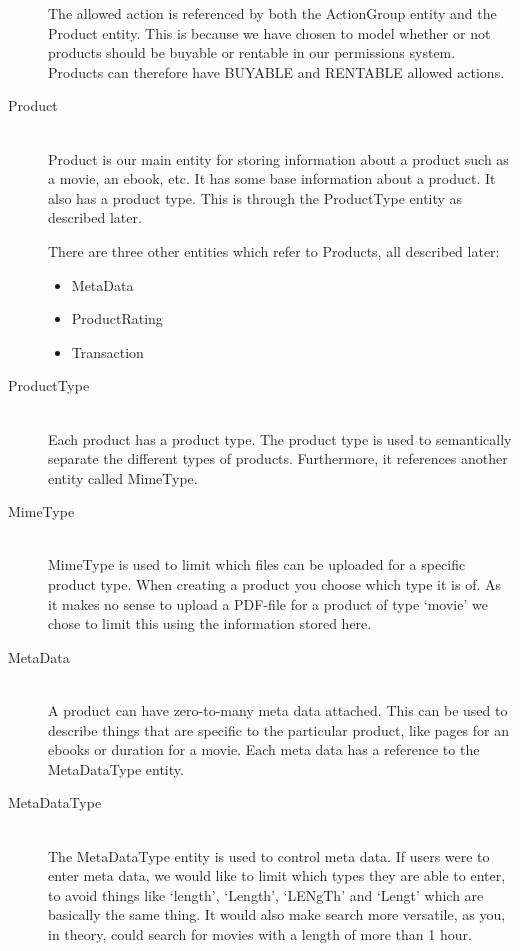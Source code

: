 \begin{description}
The allowed action is referenced by both the ActionGroup entity and the Product entity. This is because we have chosen to model whether or not products should be buyable or rentable in our permissions system. Products can therefore have BUYABLE and RENTABLE allowed actions.

\item[Product] \hfill \\ 
Product is our main entity for storing information about a product such as a movie, an ebook, etc. It has some base information about a product. It also has a product type. This is through the ProductType entity as described later.

There are three other entities which refer to Products, all described later:
\begin{itemize}
	\item MetaData
	\item ProductRating
	\item Transaction
\end{itemize}

\item[ProductType] \hfill \\
Each product has a product type. The product type is used to semantically separate the different types of products. Furthermore, it references another entity called MimeType.

\item[MimeType] \hfill \\
MimeType is used to limit which files can be uploaded for a specific product type. When creating a product you choose which type it is of. As it makes no sense to upload a PDF-file for a product of type `movie' we chose to limit this using the information stored here.

\item[MetaData] \hfill \\
A product can have zero-to-many meta data attached. This can be used to describe things that are specific to the particular product, like pages for an ebooks or duration for a movie. Each meta data has a reference to the MetaDataType entity.

\item[MetaDataType] \hfill \\
The MetaDataType entity is used to control meta data. If users were to enter meta data, we would like to limit which types they are able to enter, to avoid things like `length', `Length', `LENgTh' and `Lengt' which are basically the same thing. It would also make search more versatile, as you, in theory, could search for movies with a length of more than 1 hour.


\end{description}

